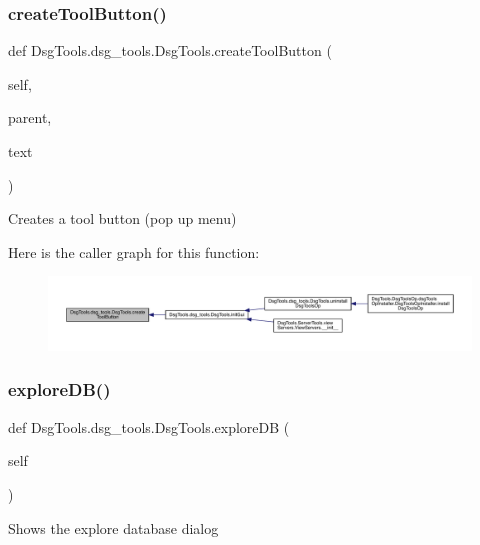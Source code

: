 \subsubsection{\texorpdfstring{create\+Tool\+Button()}{createToolButton()}}
{\footnotesize\ttfamily def Dsg\+Tools.\+dsg\+\_\+tools.\+Dsg\+Tools.\+create\+Tool\+Button (\begin{DoxyParamCaption}\item[{}]{self,  }\item[{}]{parent,  }\item[{}]{text }\end{DoxyParamCaption})}

\begin{DoxyVerb}Creates a tool button (pop up menu)
\end{DoxyVerb}
 Here is the caller graph for this function\+:
\nopagebreak
\begin{figure}[H]
\begin{center}
\leavevmode
\includegraphics[width=350pt]{class_dsg_tools_1_1dsg__tools_1_1_dsg_tools_a7f1c3ecc3fab9165222ccad53bc61c01_icgraph}
\end{center}
\end{figure}
\mbox{\label{class_dsg_tools_1_1dsg__tools_1_1_dsg_tools_a672657bbc8d5b00fb485dea4eef6fcb1}} 
\subsubsection{\texorpdfstring{explore\+D\+B()}{exploreDB()}}
{\footnotesize\ttfamily def Dsg\+Tools.\+dsg\+\_\+tools.\+Dsg\+Tools.\+explore\+DB (\begin{DoxyParamCaption}\item[{}]{self }\end{DoxyParamCaption})}

\begin{DoxyVerb}Shows the explore database dialog
\end{DoxyVerb}
 \mbox{\label{class_dsg_tools_1_1dsg__tools_1_1_dsg_tools_ad85466220ae044da1b255a54b0943b59}} 
